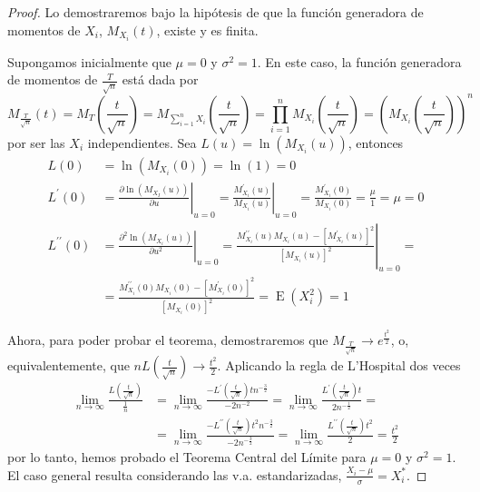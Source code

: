 \documentclass[11pt]{article}
\theoremstyle{plain}
\theoremstyle{definition}
\theoremstyle{remark}
\newcommand{\esp}[0]{\ensuremath{\operatorname{E}}}  %
\begin{document}
    \begin{proof}
      Lo demostraremos bajo la hipótesis de que la función generadora de momentos de $X_i$, $M_{X_i}(t)$, existe y es finita.

      Supongamos inicialmente que $\mu = 0$ y $\sigma^2 = 1$. En este caso, la función generadora de momentos de $\frac{T}{\sqrt{n}}$ está dada por
      \[ M_{\frac{T}{\sqrt{n}}}(t) = M_T \left( \frac{t}{\sqrt{n}} \right) = M_{\sum_{i=1}^n X_i} \left( \frac{t}{\sqrt{n}} \right) = \prod_{i=1}^n M_{X_i} \left( \frac{t}{\sqrt{n}} \right)  = \left( M_{X_i} \left(\frac{t}{\sqrt{n}} \right) \right)^n \]
      por ser las $X_i$ independientes. Sea $L(u) = \ln(M_{X_i}(u))$, entonces
      \[ \begin{split}
        L(0) &= \ln(M_{X_i} (0)) = \ln(1) = 0 \\
        L^\prime(0) &= \left. \frac{\partial \ln(M_{X_I}(u))}{\partial u} \right\vert_{u=0} = \left. \frac{M^\prime_{X_i}(u)}{M_{X_i}(u)} \right\vert_{u=0} = \frac{M^\prime_{X_i}(0)}{M_{X_i}(0)} = \frac{\mu}{1} = \mu = 0 \\
        L^{\prime\prime}(0) &= \left. \frac{\partial^2 \ln(M_{X_i}(u))}{\partial u^2} \right\vert_{u=0} = \left. \frac{M^{\prime\prime}_{X_i}(u) M_{X_i}(u) - [M^\prime_{X_i}(u)]^2}{[M_{X_i}(u)]^2} \right\vert_{u=0} = \\
        &= \frac{M^{\prime\prime}_{X_i}(0) M_{X_i}(0) - [M^\prime_{X_i}(0)]^2}{[M_{X_i}(0)]^2} = \esp(X_i^2) = 1
      \end{split} \]

      Ahora, para poder probar el teorema, demostraremos que $M_{\frac{T}{\sqrt{n}}} \to e^{\frac{t^2}{2}}$, o, equivalentemente, que $n L \left( \frac{t}{\sqrt{n}} \right) \to \frac{t^2}{2}$. Aplicando la regla de L'Hospital dos veces
      \[ \begin{split}
        \lim_{n \to \infty} \frac{L\left(\frac{t}{\sqrt{n}} \right)}{\frac{1}{n}} &= \lim_{n \to \infty} \frac{- L^\prime \left(\frac{t}{\sqrt{n}} \right) t n^{-\frac{3}{2}}}{-2 n^{-2}} = \lim_{n \to \infty} \frac{L^\prime \left( \frac{t}{\sqrt{n}} \right) t}{2 n^{- \frac{1}{2}}} = \\
        &= \lim_{n \to \infty} \frac{-L^{\prime\prime} \left( \frac{t}{\sqrt{n}} \right) t^2 n^{-\frac{3}{2}}}{-2n^{-\frac{3}{2}}} = \lim_{n \to \infty} \frac{L^{\prime\prime} \left( \frac{t}{\sqrt{n}} \right) t^2}{2} = \frac{t^2}{2}
      \end{split} \]
      por lo tanto, hemos probado el Teorema Central del Límite para $\mu = 0$ y $\sigma^2 = 1$. El caso general resulta considerando las v.a. estandarizadas, $\frac{X_i - \mu}{\sigma} = X^*_i$.
    \end{proof}
\end{document}
